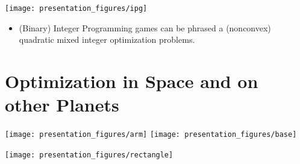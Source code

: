 \documentclass{article}
\begin{document}
\texttt{[image: presentation\_figures/ipg]}

\begin{itemize}
\item (Binary) Integer Programming games can be phrased a (nonconvex) quadratic mixed integer optimization problems. 
\end{itemize}

\section{Optimization in Space and on other Planets}

\begin{center}
\texttt{[image: presentation\_figures/arm]}
\texttt{[image: presentation\_figures/base]}
\end{center}
\newpage

\begin{center}
\texttt{[image: presentation\_figures/rectangle]}
\end{center}
\end{document}

